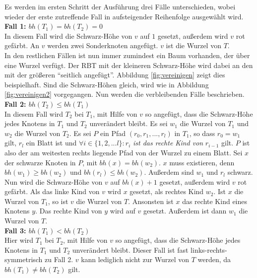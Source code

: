 \documentclass[a4paper,12pt]{article}
\begin{document}
Es werden im ersten Schritt der Ausführung drei Fälle unterschieden, wobei wieder der erste zutreffende Fall in aufsteigender Reihenfolge ausgewählt wird. \\
\noindent\textbf{Fall 1: $bh(T_1) = bh(T_2) = 0$ }\\   
In diesem Fall wird die Schwarz-Höhe von $v$  auf $1$ gesetzt, außerdem wird $v$ rot gefärbt. An $v$ werden zwei Sonderknoten angefügt. $v$ ist die Wurzel von $T$. \\
In den restlichen Fällen ist nun immer zumindest ein Baum vorhanden, der über eine Wurzel verfügt. Der RBT mit der kleineren Schwarz-Höhe wird dabei an den mit der größeren \enquote{seitlich angefügt}. Abbildung \ref{fig:vereinigen} zeigt dies beispielhaft. Sind die Schwarz-Höhen gleich, wird wie in Abbildung \ref{fig:vereinigen2} vorgegangen. Nun werden die verbleibenden Fälle beschrieben.\\
\noindent\textbf{Fall 2: $bh(T_2) \leq bh(T_1)$ }\\
In diesem Fall wird $T_2$ bei $T_1$, mit Hilfe von $v$ so angefügt, dass die Schwarz-Höhe jedes Knotens in $T_1$ und $T_2$ unverändert bleibt. Es sei $w_1$ die Wurzel von $T_1$ und $w_2$ die Wurzel von $T_2$. Es sei $P$ ein Pfad $(r_0,r_1,...,r_l)$ in $T_1$, so dass $r_0 = w_1$  gilt, $r_l$ ein Blatt ist und $\forall i \in \{1,2,...l\} \colon r_i$  \textit{ist das rechte Kind von}  $r_{i-1}$ gilt. $P$ ist also der am weitesten rechts liegende Pfad von der Wurzel zu einem Blatt. Sei $x$ der schwarze Knoten in $P$, mit $\mathit{bh}(x) = \mathit{bh}(w_2)$. $x$ muss existieren, denn $\mathit{bh}(w_1) \geq \mathit{bh}(w_2)$ und $\mathit{bh}(r_l) \leq  \mathit{bh}(w_2)$. Außerdem sind $w_1$ und $r_l$ schwarz.\\
Nun wird die Schwarz-Höhe von $v$ auf $\mathit{bh}(x) + 1$ gesetzt, außerdem wird $v$ rot gefärbt. Als das linke Kind von $v$  wird $x$ gesetzt, als rechtes Kind $w_2$. Ist $x$ die Wurzel von $T_1$, so ist $v$ die Wurzel von $T$. Ansonsten ist $x$ das rechte Kind eines Knotens $y$. Das rechte Kind von $y$ wird auf $v$ gesetzt. Außerdem ist dann $w_1$ die Wurzel von $T$.     \\  
\noindent\textbf{Fall 3: $bh(T_1) < bh(T_2)$ }\\ 
Hier wird $T_1$ bei $T_2$, mit Hilfe von $v$ so angefügt, dass die Schwarz-Höhe jedes Knotens in $T_1$ und $T_2$  unverändert bleibt. Dieser Fall ist fast links-rechts-symmetrisch zu Fall 2. $v$ kann lediglich nicht zur Wurzel von $T$ werden, da $bh(T_1) \neq bh(T_2)$ gilt.
\end{document}
